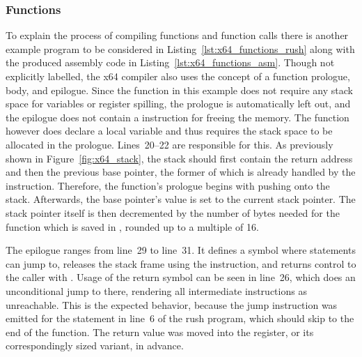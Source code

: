 \subsubsection{Functions}


To explain the process of compiling functions and function calls there is another example program to be considered in Listing~\ref{lst:x64_functions_rush} along with the produced assembly code in Listing~\ref{lst:x64_functions_asm}.
Though not explicitly labelled, the x64 compiler also uses the concept of a function prologue, body, and epilogue.
Since the  function in this example does not require any stack space for variables or register spilling, the prologue is automatically left out, and the epilogue does not contain a  instruction for freeing the memory.
The  function however does declare a local variable and thus requires the stack space to be allocated in the prologue.
Lines~20--22 are responsible for this.
As previously shown in Figure~\ref{fig:x64_stack}, the stack should first contain the return address and then the previous base pointer, the former of which is already handled by the  instruction.
Therefore, the function's prologue begins with pushing  onto the stack.
Afterwards, the base pointer's value is set to the current stack pointer.
The stack pointer itself is then decremented by the number of bytes needed for the function which is saved in , rounded up to a multiple of 16.


The epilogue ranges from line~29 to line~31.
It defines a symbol where  statements can jump to, releases the stack frame using the  instruction, and returns control to the caller with .
Usage of the return symbol can be seen in line~26, which does an unconditional jump to there, rendering all intermediate instructions as unreachable.
This is the expected behavior, because the jump instruction was emitted for the  statement in line~6 of the rush program, which should skip to the end of the function.
The return value was moved into the  register, or its correspondingly sized variant, in advance.

